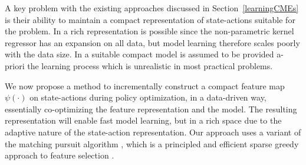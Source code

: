 \documentclass[letterpaper]{article}
\newcommand{\CsabaFLAM}{DBLP:conf/adprl/YaoSPZ14}
\newcommand{\GrunewalderEmbeddingsRL}{GrunewalderEmbeddingsMDP}
\newcommand{\MallatMatchingPursuit}{DBLP:journals/tsp/MallatZ93}
\newcommand{\ZhangMPConsistencey}{DBLP:journals/jmlr/Zhang09}
\newcommand{\HussainTheoryOfMP}{DBLP:conf/nips/HussainS08}
\begin{document}
A key problem with the existing approaches discussed in Section~\ref{learningCMEs} is their ability to maintain a compact representation of state-actions suitable for the problem. In \cite{\GrunewalderEmbeddingsRL} a rich representation is possible since the non-parametric kernel regressor has an expansion on all data, but model learning therefore scales poorly with the data size. In \cite{\CsabaFLAM} a suitable compact model is assumed to be provided a-priori the learning process which is unrealistic in most practical problems.

We now propose a method to incrementally construct a compact feature map $\psi(\cdot)$ on state-actions during policy optimization, in a data-driven way, essentially co-optimizing the feature representation and the model. The resulting representation will enable fast model learning, but in a rich space due to the adaptive nature of the state-action representation. Our approach uses a variant of the matching pursuit algorithm \citep{\MallatMatchingPursuit}, which is a principled and efficient sparse greedy approach to feature selection \citep{\ZhangMPConsistencey,\HussainTheoryOfMP}.
\end{document}

